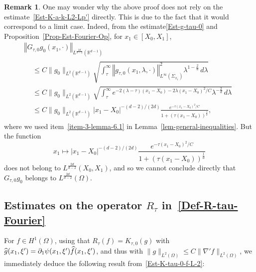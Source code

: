 \documentclass[10pt]{amsart}
\theoremstyle{definition}\newtheorem{defi}[theo]{Definition}\newtheorem{rema}[theo]{Remark}\newtheorem{exam}[theo]{Example}\newtheorem{exem}[theo]{Example}\newtheorem{nota}[theo]{Notation}
\newcommand*\R{\mathbb{R}}
\newcommand{\norm}[1]{\left\Vert#1\right\Vert}
\renewcommand{\leq}{\leqslant}
\renewcommand{\hat}{\widehat}
\let\oldhat\hat
\renewcommand*{\hat}[1]{\mathchoice{\widehat{#1}}{\widehat{#1}}{\oldhat{#1}}{\oldhat{#1}}}
\begin{document}
\begin{rema}
One may wonder why the above proof does not rely on the estimate~\eqref{Est-K-a-k-L2-Lp'} directly. This is due to the fact that it would correspond to a limit case. Indeed, from the estimate\eqref{Est-g-tau-0} and Proposition~\ref{Prop-Est-Fourier-Op}, for $x_1 \in [X_0, X_1]$,
\begin{multline*}
 \norm{{G_{\tau,0} g_0}(x_1, \cdot) }_{L^{\frac{2d}{d-2}}\left(\R^{d-1}\right)}\\
\begin{aligned}
&\leq C \| g_0 \|_{L^2\left(\R^{d-1}\right)}
\sqrt{\int_\tau^\infty \norm{ g_{\tau,0}(x_1,\lambda, \cdot)}^2_{L^\infty(\Sigma_{x_1})} \lambda^{1 - \frac{2}{d}} \, d\lambda}
\\
&
\leq C\| g_0 \|_{L^2\left(\R^{d-1}\right)}
\sqrt{\int_\tau^\infty e^{-2 (\lambda - \tau)(x_1 - X_0) - 2 \lambda (x_1 - X_0)^2/C}
\lambda^{- \frac{2}{d}} \, d\lambda}
\\
& \leq C \| g_0 \|_{L^2\left(\R^{d-1}\right)} |x_1 -X_0|^{-(d-2)/(2d)} \frac{e^{ - \tau (x_1 - X_0)^2/C}}{1+ (\tau (x_1 - X_0))^{\frac{1}{d}}},
\end{aligned}
\end{multline*}
where we used item~\eqref{item-3-lemma-6.1} in Lemma~\ref{lem-general-inequalities}. But the function
\[
x_1 \mapsto |x_1 -X_0|^{-(d-2)/(2d)} \frac{e^{ - \tau (x_1 - X_0)^2/C}}{1+ (\tau (x_1 - X_0))^{\frac{1}{d}}}
\]
does not belong to $L^{\frac{2d}{d-2}}(X_0, X_1)$, and so we cannot conclude directly that $G_{\tau, 0} g_0 $ belongs to $L^{\frac{2d}{d-2}}(\Omega)$.
\end{rema}

\subsection{Estimates on the operator \texorpdfstring{$R_\tau$}{R tau} in~\eqref{Def-R-tau-Fourier}}

For $f \in H^1(\Omega)$, using that $R_\tau (f) = K_{\tau,0} (g)$ with $ \hat g(x_1, \xi') = \partial_1 \psi(x_1, \xi') \hat f(x_1, \xi')$, and thus with $\| g \|_{L^2(\Omega)} \leq C \| \nabla' f \|_{L^2(\Omega)}$, we immediately deduce the following result from~\eqref{Est-K-tau-0-f-L-2}:
\end{document}
